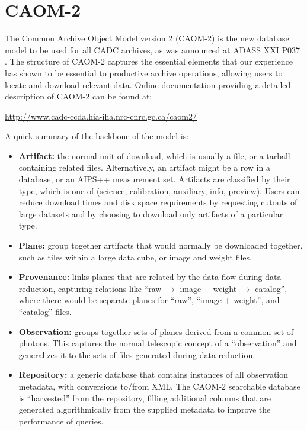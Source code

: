 \section{CAOM-2}
The Common Archive Object Model version 2 (CAOM-2) is the new database model to be used for all CADC archives, as was announced at ADASS XXI P037 \citet{P037_adassxxi}.  The structure of CAOM-2 captures the essential elements that our experience has shown to be essential to productive archive operations, allowing users to locate and download relevant data.  Online documentation providing a detailed description of CAOM-2 can be found at:
\begin{center}
 \url{http://www.cadc-ccda.hia-iha.nrc-cnrc.gc.ca/caom2/}
 \end{center}  
A quick summary of the backbone of the model is:
\begin{itemize}
\item {\bf Artifact:} the normal unit of download, which is usually a file, or a tarball containing related files.  Alternatively, an artifact might be a row in a database, or an AIPS++ measurement set.  Artifacts are classified by their type, which is one of (science, calibration, auxiliary, info, preview).  Users can reduce download times and disk space requirements by requesting cutouts of large datasets and by choosing to download only artifacts of a particular type.
\item {\bf Plane:} group together artifacts that would normally be downloaded together, such as tiles within a large data cube, or image and weight files.
\item {\bf Provenance:} links planes that are related by the data flow during data reduction, capturing relations like ``raw $\rightarrow$ image + weight $\rightarrow$ catalog'', where there would be separate planes for ``raw'', ``image + weight'', and ``catalog'' files.
\item {\bf Observation:} groups together sets of planes derived from a common set of photons.  This captures the normal telescopic concept of a ``observation'' and generalizes it to the sets of files generated during data reduction.  
\item {\bf Repository:} a generic database that contains instances of all observation metadata, with conversions to/from XML.  The CAOM-2 searchable database is ``harvested'' from the repository, filling additional columns that are generated algorithmically from the supplied metadata to improve the performance of queries. 
\end{itemize}

